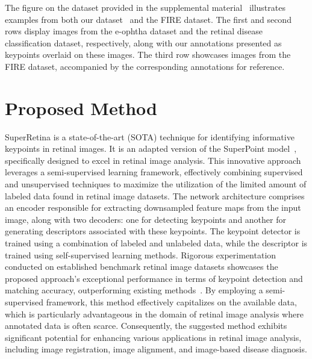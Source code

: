 \documentclass[10pt,twocolumn,letterpaper]{article}
\begin{document}
The figure on the dataset provided in the supplemental material~\cite{Authors14} illustrates examples from both our dataset~\cite{medal2023} and the FIRE dataset. The first and second rows display images from the e-ophtha dataset and the retinal disease classification dataset, respectively, along with our annotations presented as keypoints overlaid on these images. The third row showcases images from the FIRE dataset, accompanied by the corresponding annotations for reference.

















\section{Proposed Method}
\label{sec:proposed}

SuperRetina \cite{liu2022semi} is a state-of-the-art (SOTA) technique for identifying informative keypoints in retinal images. It is an adapted version of the SuperPoint model~\cite{detone2018superpoint}, specifically designed to excel in retinal image analysis. This innovative approach leverages a semi-supervised learning framework, effectively combining supervised and unsupervised techniques to maximize the utilization of the limited amount of labeled data found in retinal image datasets. The network architecture comprises an encoder responsible for extracting downsampled feature maps from the input image, along with two decoders: one for detecting keypoints and another for generating descriptors associated with these keypoints. The keypoint detector is trained using a combination of labeled and unlabeled data, while the descriptor is trained using self-supervised learning methods. Rigorous experimentation conducted on established benchmark retinal image datasets showcases the proposed approach's exceptional performance in terms of keypoint detection and matching accuracy, outperforming existing methods~\cite{fire_dataset}. By employing a semi-supervised framework, this method effectively capitalizes on the available data, which is particularly advantageous in the domain of retinal image analysis where annotated data is often scarce. Consequently, the suggested method exhibits significant potential for enhancing various applications in retinal image analysis, including image registration, image alignment, and image-based disease diagnosis.
\end{document}
